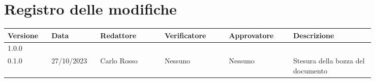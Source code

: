 
\section*{Registro delle modifiche}
{
\renewcommand{\arraystretch}{1.5}
\scriptsize
\begin{tabular}{p{0.10\linewidth}p{0.10\linewidth}p{0.15\linewidth}p{0.15\linewidth}p{0.15\linewidth}p{0.19\linewidth}}
    \textbf{Versione}   & \textbf{Data} & \textbf{Redattore}     & \textbf{Verificatore} & \textbf{Approvatore}  & \textbf{Descrizione}  \\
    \hline
	1.0.0 \\
    \hline
	0.1.0 & 27/10/2023 & Carlo Rosso & Nessuno & Nessuno & Stesura
	della bozza del documento \\
    \hline
\end{tabular}
}

